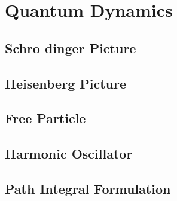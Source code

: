 \section{Quantum Dynamics}
\subsection{Schr\:o dinger Picture}
\subsection{Heisenberg Picture}
\subsection{Free Particle}
\subsection{Harmonic Oscillator}
\subsection{Path Integral Formulation}
